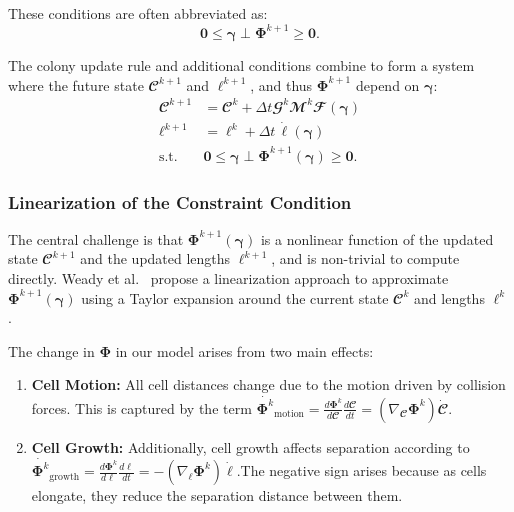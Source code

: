 \documentclass[conference]{IEEEtran}
\begin{document}
These conditions are often abbreviated as:
\begin{equation}
    \mathbf{0} \leq \boldsymbol{\gamma} \perp \mathbf{\Phi}^{k+1} \geq \mathbf{0}.
\end{equation}


The colony update rule and additional conditions combine to form a system where the future state $\mathbfcal{C}^{k+1}$ and $\boldsymbol{\ell}^{k+1}$, and thus $\mathbf{\Phi}^{k+1}$ depend on $\boldsymbol{\gamma}$:
\begin{equation} \label{eq:colony_update_with_constraints}
    \begin{split}
        \mathbfcal{C}^{k+1} & = \mathbfcal{C}^k + \Delta t \mathbfcal{G}^k \mathbfcal{M}^k \mathbfcal{F}(\boldsymbol{\gamma})  \\
        \boldsymbol{\ell}^{k+1} & = \boldsymbol{\ell}^k + \Delta t \, \dot{\boldsymbol{\ell}}(\boldsymbol{\gamma}) \\
        \text{s.t.} \quad & \mathbf{0} \leq \boldsymbol{\gamma} \perp \mathbf{\Phi}^{k+1}(\boldsymbol{\gamma}) \geq \mathbf{0}.
    \end{split}
\end{equation}

\subsubsection{Linearization of the Constraint Condition}

The central challenge is that $\mathbf{\Phi}^{k+1}(\boldsymbol{\gamma})$ is a nonlinear function of the updated state $\mathbfcal{C}^{k+1}$ and the updated lengths $\boldsymbol{\ell}^{k+1}$, and is non-trivial to compute directly. Weady et al.~\cite{Weady2024SM} propose a linearization approach to approximate $\mathbf{\Phi}^{k+1}(\boldsymbol{\gamma})$ using a Taylor expansion around the current state $\mathbfcal{C}^k$ and lengths $\boldsymbol{\ell}^k$.

\noindent The change in $\mathbf{\Phi}$ in our model arises from two main effects:

\begin{enumerate}
    \item \textbf{Cell Motion:} All cell distances change due to the motion driven by collision forces. This is captured by the term $\dot{\mathbf{\Phi}^k}_{\text{motion}} = \frac{d \mathbf{\Phi}^k}{d \mathbfcal{C}} \frac{d \mathbfcal{C}}{dt} = (\nabla_{\mathbfcal{C}} \mathbf{\Phi}^k) \dot{\mathbfcal{C}}$.
    \item \textbf{Cell Growth:} Additionally, cell growth affects separation according to $\dot{\mathbf{\Phi}^k}_{\text{growth}} = \frac{d \mathbf{\Phi}^k}{d \boldsymbol{\ell}} \frac{d \boldsymbol{\ell}}{dt} =-(\nabla_{\boldsymbol{\ell}} \mathbf{\Phi}^k) \dot{\boldsymbol{\ell}}$.\newline The negative sign arises because as cells elongate, they reduce the separation distance between them.
\end{enumerate}
\end{document}
